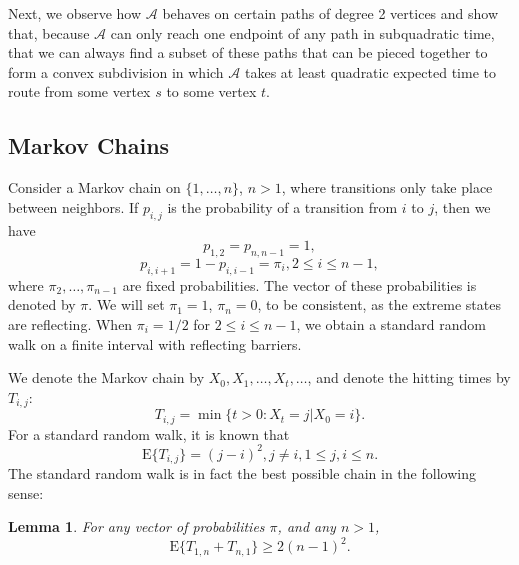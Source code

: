 \documentclass [letterpaper] {patmorin}
\newtheorem{lemma}{Lemma}%
\newcommand{\EXP}{\mathrm{E}}
\begin{document}
Next, we observe how $\mathcal{A}$ behaves on certain paths of degree 2 vertices and show that, because $\mathcal{A}$ can only reach one endpoint of any path in subquadratic time, that we can always find a subset of these paths that can be pieced together to form a convex subdivision in which $\mathcal{A}$ takes at least quadratic expected time to route from some vertex $s$ to some vertex $t$.

\subsection{Markov Chains}
\label{sec:markov}

Consider a Markov chain on $\{ 1, \ldots, n \}$, $n > 1$, where transitions only
take place between neighbors. If $p_{i,j}$ is the probability of a transition
from $i$ to $j$, then we have 
\[
p_{1,2} = p_{n,n-1} = 1,
\]
\[
p_{i,i+1} = 1-p_{i,i-1} = \pi_i, 2 \le i \le n-1,
\]
where $\pi_2, \ldots, \pi_{n-1}$ are fixed probabilities.
The vector of these probabilities is denoted by $\pi$.
We will set $\pi_1 = 1$, $\pi_n = 0$, to be consistent, as the
extreme states are reflecting.  When $\pi_i = 1/2$ for $2 \le i \le n-1$,
we obtain a standard random walk on a finite interval with reflecting barriers.

We denote the Markov chain by $X_0, X_1, \ldots, X_t , \ldots$,
and denote the hitting times by $T_{i,j}$:
\[
T_{i,j} = \min \{ t > 0: X_t = j | X_0 = i \}.
\]
For a standard random walk, it is known that
\[
\EXP \{ T_{i,j} \} = (j-i)^2, j \not= i, 1 \le j,i \le n.
\]
The standard random walk is in fact the best possible chain in the following sense:

\begin{lemma}\label{lemma:backandforth}
For any vector of probabilities $\pi$, and any $n > 1$,
\[
\EXP \{ T_{1,n} + T_{n,1} \} \ge 2 (n-1)^2.
\]
\end{lemma}
\end{document}
